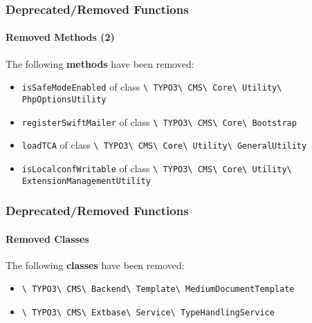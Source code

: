\begin{frame}[fragile]
	\frametitle{Deprecated/Removed Functions}
	\framesubtitle{Removed Methods (2)}

	The following \textbf{methods} have been removed:

	\begin{itemize}

		\item
			\small
				\texttt{isSafeModeEnabled}\newline
				of class
				\texttt{\textbackslash
					TYPO3\textbackslash
					CMS\textbackslash
					Core\textbackslash
					Utility\textbackslash
					PhpOptionsUtility}
			\normalsize
		\item
			\small
				\texttt{registerSwiftMailer}\newline
				of class
				\texttt{\textbackslash
					TYPO3\textbackslash
					CMS\textbackslash
					Core\textbackslash
					Bootstrap}
			\normalsize
		\item
			\small
				\texttt{loadTCA}\newline
				of class
				\texttt{\textbackslash
					TYPO3\textbackslash
					CMS\textbackslash
					Core\textbackslash
					Utility\textbackslash
					GeneralUtility}
			\normalsize
		\item
			\small
				\texttt{isLocalconfWritable}\newline
				of class
				\texttt{\textbackslash
					TYPO3\textbackslash
					CMS\textbackslash
					Core\textbackslash
					Utility\textbackslash
					ExtensionManagementUtility}
			\normalsize

	\end{itemize}

\end{frame}


\begin{frame}[fragile]
	\frametitle{Deprecated/Removed Functions}
	\framesubtitle{Removed Classes}

	The following \textbf{classes} have been removed:

	\begin{itemize}

		\item
			\smaller
				\texttt{\textbackslash
					TYPO3\textbackslash
					CMS\textbackslash
					Backend\textbackslash
					Template\textbackslash
					MediumDocumentTemplate}
			\normalsize
		\item
			\smaller
				\texttt{\textbackslash
					TYPO3\textbackslash
					CMS\textbackslash
					Extbase\textbackslash
					Service\textbackslash
					TypeHandlingService}
			\normalsize

	\end{itemize}

\end{frame}

